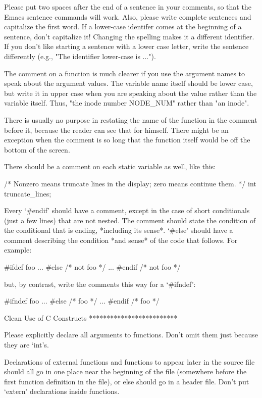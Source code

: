    Please put two spaces after the end of a sentence in your comments,
so that the Emacs sentence commands will work.  Also, please write
complete sentences and capitalize the first word.  If a lower-case
identifer comes at the beginning of a sentence, don't capitalize it!
Changing the spelling makes it a different identifier.  If you don't
like starting a sentence with a lower case letter, write the sentence
differently (e.g., "The identifier lower-case is ...").

   The comment on a function is much clearer if you use the argument
names to speak about the argument values.  The variable name itself
should be lower case, but write it in upper case when you are speaking
about the value rather than the variable itself.  Thus, "the inode
number NODE_NUM" rather than "an inode".

   There is usually no purpose in restating the name of the function in
the comment before it, because the reader can see that for himself.
There might be an exception when the comment is so long that the
function itself would be off the bottom of the screen.

   There should be a comment on each static variable as well, like this:

     /* Nonzero means truncate lines in the display;
        zero means continue them.  */
     int truncate_lines;

   Every `#endif' should have a comment, except in the case of short
conditionals (just a few lines) that are not nested.  The comment should
state the condition of the conditional that is ending, *including its
sense*.  `#else' should have a comment describing the condition *and
sense* of the code that follows.  For example:

     #ifdef foo
       ...
     #else /* not foo */
       ...
     #endif /* not foo */

but, by contrast, write the comments this way for a `#ifndef':

     #ifndef foo
       ...
     #else /* foo */
       ...
     #endif /* foo */

Clean Use of C Constructs
*************************

   Please explicitly declare all arguments to functions.  Don't omit
them just because they are `int's.

   Declarations of external functions and functions to appear later in
the source file should all go in one place near the beginning of the
file (somewhere before the first function definition in the file), or
else should go in a header file.  Don't put `extern' declarations inside
functions.

